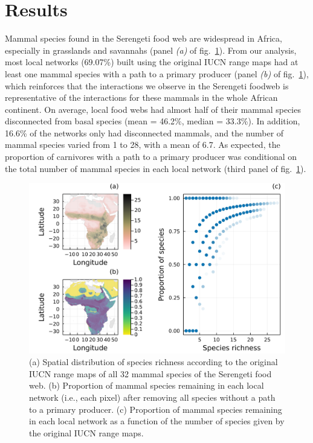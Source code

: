 \documentclass[10pt,oneside]{article}
\makeatletter
\def\maxwidth{\ifdim\Gin@nat@width>\linewidth\linewidth
\else\Gin@nat@width\fi}
\let\Oldincludegraphics\includegraphics
\renewcommand{\includegraphics}[1]{\Oldincludegraphics[width=\maxwidth]{#1}}
\makeatother
\begin{document}
\hypertarget{results}{%
\section{Results}\label{results}}

Mammal species found in the Serengeti food web are widespread in Africa,
especially in grasslands and savannahs (panel \emph{(a)} of
fig.~\ref{fig:richness}). From our analysis, most local networks
(69.07\%) built using the original IUCN range maps had at least one
mammal species with a path to a primary producer (panel \emph{(b)} of
fig.~\ref{fig:richness}), which reinforces that the interactions we
observe in the Serengeti foodweb is representative of the interactions
for these mammals in the whole African continent. On average, local food
webs had almost half of their mammal species disconnected from basal
species (mean = 46.2\%, median = 33.3\%). In addition, 16.6\% of the
networks only had disconnected mammals, and the number of mammal species
varied from 1 to 28, with a mean of 6.7. As expected, the proportion of
carnivores with a path to a primary producer was conditional on the
total number of mammal species in each local network (third panel of
fig.~\ref{fig:richness}).

\begin{figure}
\hypertarget{fig:richness}{%
\centering
\includegraphics{figures/richness_prop_removed.png}
\caption{(a) Spatial distribution of species richness according to the
original IUCN range maps of all 32 mammal species of the Serengeti food
web. (b) Proportion of mammal species remaining in each local network
(i.e., each pixel) after removing all species without a path to a
primary producer. (c) Proportion of mammal species remaining in each
local network as a function of the number of species given by the
original IUCN range maps.}\label{fig:richness}
}
\end{figure}
\end{document}
